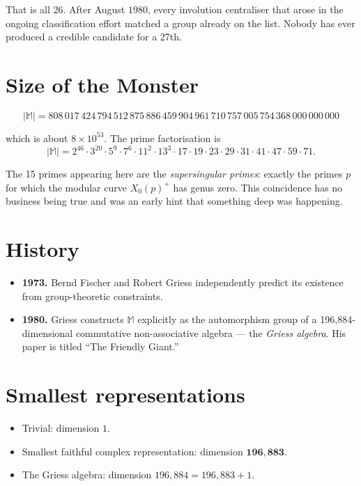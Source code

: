 \documentclass[11pt]{article}
\newcommand{\M}{\mathbb{M}}
\begin{document}
That is all 26. After August $1980$, every involution centraliser
that arose in the ongoing classification effort matched a group
already on the list. Nobody has ever produced a credible candidate
for a 27th.

\section*{Size of the Monster}

\[
|\M| = 808\,017\,424\,794\,512\,875\,886\,459\,904\,961\,710\,757\,005\,754\,368\,000\,000\,000
\]

\noindent which is about $8 \times 10^{53}$. The prime factorisation is
\[
|\M| = 2^{46} \cdot 3^{20} \cdot 5^9 \cdot 7^6 \cdot 11^2 \cdot 13^3 \cdot 17 \cdot 19 \cdot 23 \cdot 29 \cdot 31 \cdot 41 \cdot 47 \cdot 59 \cdot 71 .
\]

\noindent The 15 primes appearing here are the \emph{supersingular primes}:
exactly the primes $p$ for which the modular curve $X_0(p)^+$ has genus
zero. This coincidence has no business being true and was an early hint
that something deep was happening.

\section*{History}

\begin{itemize}[leftmargin=*, itemsep=2pt]
  \item \textbf{1973.} Bernd Fischer and Robert Griess independently
        predict its existence from group-theoretic constraints.
  \item \textbf{1980.} Griess constructs $\M$ explicitly as the
        automorphism group of a 196{,}884-dimensional commutative
        non-associative algebra --- the \emph{Griess algebra}.
        His paper is titled ``The Friendly Giant.''
\end{itemize}

\section*{Smallest representations}

\begin{itemize}[leftmargin=*, itemsep=2pt]
  \item Trivial: dimension $1$.
  \item Smallest faithful complex representation: dimension
        $\mathbf{196{,}883}$.
  \item The Griess algebra: dimension $196{,}884 = 196{,}883 + 1$.
\end{itemize}
\end{document}
